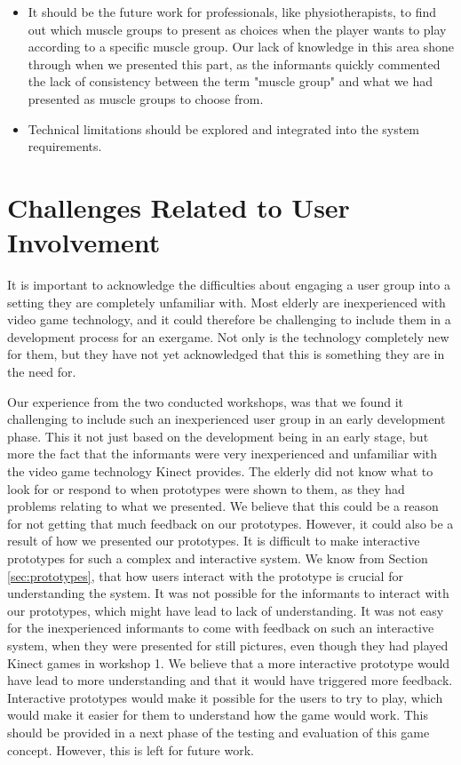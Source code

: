 \begin{itemize}
\item It should be the future work for professionals, like physiotherapists, to find out which muscle groups to present as choices when the player wants to play according to a specific muscle group. Our lack of knowledge in this area shone through when we presented this part, as the informants quickly commented the lack of consistency between the term "muscle group" and what we had presented as muscle groups to choose from. 
\item Technical limitations should be explored and integrated into the system requirements.
\end{itemize}

\section{Challenges Related to User Involvement}

It is important to acknowledge the difficulties about engaging a user group into a setting they are completely unfamiliar with. Most elderly are inexperienced with video game technology, and it could therefore be challenging to include them in a development process for an exergame. Not only is the technology completely new for them, but they have not yet acknowledged that this is something they are in the need for. 

Our experience from the two conducted workshops, was that we found it challenging to include such an inexperienced user group in an early development phase. This it not just based on the development being in an early stage, but more the fact that the informants were very inexperienced and unfamiliar with the video game technology Kinect provides. The elderly did not know what to look for or respond to when prototypes were shown to them, as they had problems relating to what we presented. We believe that this could be a reason for not getting that much feedback on our prototypes. However, it could also be a result of how we presented our prototypes. It is difficult to make interactive prototypes for such a complex and interactive system. We know from Section \ref{sec:prototypes}, that how users interact with the prototype is crucial for understanding the system. It was not possible for the informants to interact with our prototypes, which might have lead to lack of understanding. It was not easy for the inexperienced informants to come with feedback on such an interactive system, when they were presented for still pictures, even though they had played Kinect games in workshop 1. We believe that a more interactive prototype would have lead to more understanding and that it would have triggered more feedback. Interactive prototypes would make it possible for the users to try to play, which would make it easier for them to understand how the game would work. This should be provided in a next phase of the testing and evaluation of this game concept. However, this is left for future work.

